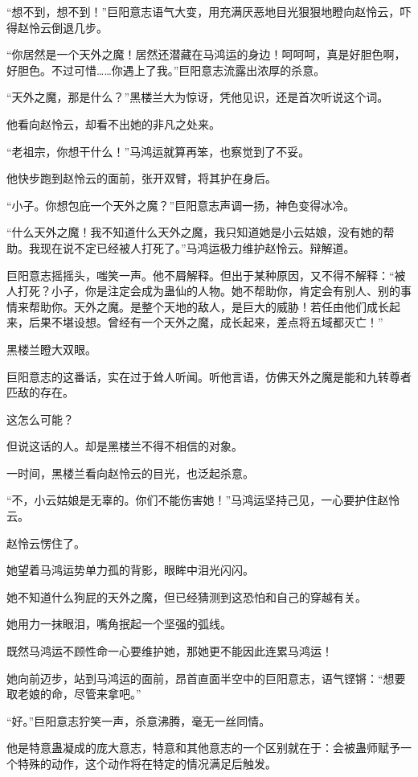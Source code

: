 \begin{this_body}
“想不到，想不到！”巨阳意志语气大变，用充满厌恶地目光狠狠地瞪向赵怜云，吓得赵怜云倒退几步。

“你居然是一个天外之魔！居然还潜藏在马鸿运的身边！呵呵呵，真是好胆色啊，好胆色。不过可惜……你遇上了我。”巨阳意志流露出浓厚的杀意。

“天外之魔，那是什么？”黑楼兰大为惊讶，凭他见识，还是首次听说这个词。

他看向赵怜云，却看不出她的非凡之处来。

“老祖宗，你想干什么！”马鸿运就算再笨，也察觉到了不妥。

他快步跑到赵怜云的面前，张开双臂，将其护在身后。

“小子。你想包庇一个天外之魔？”巨阳意志声调一扬，神色变得冰冷。

“什么天外之魔！我不知道什么天外之魔，我只知道她是小云姑娘，没有她的帮助。我现在说不定已经被人打死了。”马鸿运极力维护赵怜云。辩解道。

巨阳意志摇摇头，嗤笑一声。他不屑解释。但出于某种原因，又不得不解释：“被人打死？小子，你是注定会成为蛊仙的人物。她不帮助你，肯定会有别人、别的事情来帮助你。天外之魔。是整个天地的敌人，是巨大的威胁！若任由他们成长起来，后果不堪设想。曾经有一个天外之魔，成长起来，差点将五域都灭亡！”

黑楼兰瞪大双眼。

巨阳意志的这番话，实在过于耸人听闻。听他言语，仿佛天外之魔是能和九转尊者匹敌的存在。

这怎么可能？

但说这话的人。却是黑楼兰不得不相信的对象。

一时间，黑楼兰看向赵怜云的目光，也泛起杀意。

“不，小云姑娘是无辜的。你们不能伤害她！”马鸿运坚持己见，一心要护住赵怜云。

赵怜云愣住了。

她望着马鸿运势单力孤的背影，眼眸中泪光闪闪。

她不知道什么狗屁的天外之魔，但已经猜测到这恐怕和自己的穿越有关。

她用力一抹眼泪，嘴角抿起一个坚强的弧线。

既然马鸿运不顾性命一心要维护她，那她更不能因此连累马鸿运！

她向前迈步，站到马鸿运的面前，昂首直面半空中的巨阳意志，语气铿锵：“想要取老娘的命，尽管来拿吧。”

“好。”巨阳意志狞笑一声，杀意沸腾，毫无一丝同情。

他是特意蛊凝成的庞大意志，特意和其他意志的一个区别就在于：会被蛊师赋予一个特殊的动作，这个动作将在特定的情况满足后触发。


\end{this_body}
